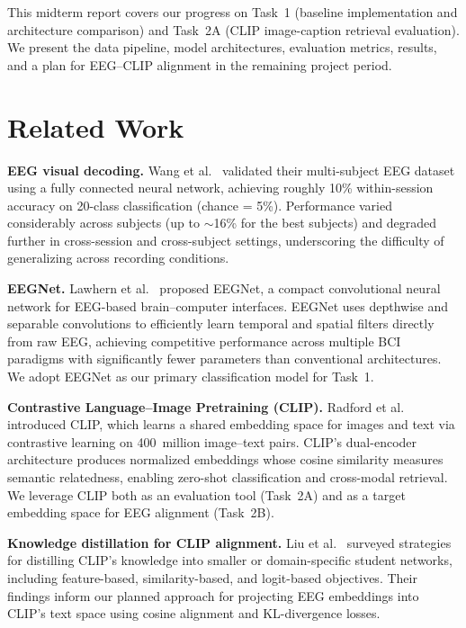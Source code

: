 \documentclass{article}
\begin{document}
This midterm report covers our progress on Task~1 (baseline implementation and architecture comparison) and Task~2A (CLIP image-caption retrieval evaluation). We present the data pipeline, model architectures, evaluation metrics, results, and a plan for EEG--CLIP alignment in the remaining project period.

\section{Related Work}
\label{sec:related}

\textbf{EEG visual decoding.}
Wang et al.~\cite{wang2025eeg} validated their multi-subject EEG dataset using a fully connected neural network, achieving roughly 10\% within-session accuracy on 20-class classification (chance = 5\%). Performance varied considerably across subjects (up to $\sim$16\% for the best subjects) and degraded further in cross-session and cross-subject settings, underscoring the difficulty of generalizing across recording conditions.

\textbf{EEGNet.}
Lawhern et al.~\cite{lawhern2018eegnet} proposed EEGNet, a compact convolutional neural network for EEG-based brain--computer interfaces. EEGNet uses depthwise and separable convolutions to efficiently learn temporal and spatial filters directly from raw EEG, achieving competitive performance across multiple BCI paradigms with significantly fewer parameters than conventional architectures. We adopt EEGNet as our primary classification model for Task~1.

\textbf{Contrastive Language--Image Pretraining (CLIP).}
Radford et al.~\cite{radford2021clip} introduced CLIP, which learns a shared embedding space for images and text via contrastive learning on 400~million image--text pairs. CLIP's dual-encoder architecture produces normalized embeddings whose cosine similarity measures semantic relatedness, enabling zero-shot classification and cross-modal retrieval. We leverage CLIP both as an evaluation tool (Task~2A) and as a target embedding space for EEG alignment (Task~2B).

\textbf{Knowledge distillation for CLIP alignment.}
Liu et al.~\cite{liu2023clipkd} surveyed strategies for distilling CLIP's knowledge into smaller or domain-specific student networks, including feature-based, similarity-based, and logit-based objectives. Their findings inform our planned approach for projecting EEG embeddings into CLIP's text space using cosine alignment and KL-divergence losses.
\end{document}
